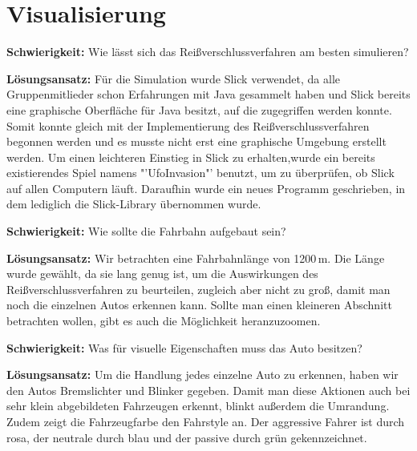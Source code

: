 \section{Visualisierung}
\textbf{Schwierigkeit:} Wie lässt sich das Reißverschlussverfahren am besten simulieren?
\begin{addmargin}[25pt]{0pt}
	\item \textbf{Lösungsansatz:} Für die Simulation wurde Slick verwendet, da alle Gruppenmitlieder schon Erfahrungen mit Java gesammelt haben und Slick bereits eine graphische Oberfläche für Java besitzt, auf die zugegriffen werden konnte. Somit konnte gleich mit der Implementierung des Reißverschlussverfahren begonnen werden und es musste nicht erst eine graphische Umgebung erstellt werden. Um einen leichteren Einstieg in Slick zu erhalten,wurde ein bereits existierendes Spiel namens "'UfoInvasion"' benutzt, um zu überprüfen, ob Slick auf allen Computern läuft. Daraufhin wurde ein neues Programm geschrieben, in dem lediglich die Slick-Library übernommen wurde. \\
\end{addmargin}
\textbf{Schwierigkeit:} Wie sollte die Fahrbahn aufgebaut sein?
\begin{addmargin}[25pt]{0pt}
	\item \textbf{Lösungsansatz:} Wir betrachten eine Fahrbahnlänge von 1200\,m. Die Länge wurde gewählt, da sie lang genug ist, um die Auswirkungen des Reißverschlussverfahren zu beurteilen, zugleich aber nicht zu groß, damit man noch die einzelnen Autos erkennen kann. Sollte man einen kleineren Abschnitt betrachten wollen, gibt es auch die Möglichkeit heranzuzoomen.\\
\end{addmargin}
\textbf{Schwierigkeit:} Was für visuelle Eigenschaften muss das Auto besitzen?
\begin{addmargin}[25pt]{0pt}
	\item \textbf{Lösungsansatz:} Um die Handlung jedes einzelne Auto zu erkennen, haben wir den Autos Bremslichter und Blinker gegeben. Damit man diese Aktionen auch bei sehr klein abgebildeten Fahrzeugen erkennt, blinkt außerdem die Umrandung. Zudem zeigt die Fahrzeugfarbe den Fahrstyle an. Der aggressive Fahrer ist durch rosa, der neutrale durch blau und der passive durch grün gekennzeichnet.\\
\end{addmargin}

